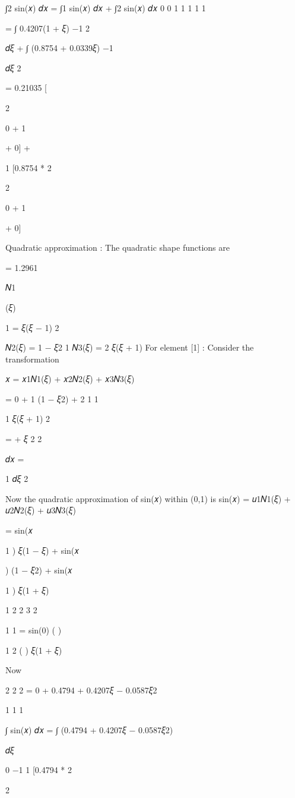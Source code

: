 {{{{{{∫2 sin(𝑥) 𝑑𝑥 = ∫1 sin(𝑥) 𝑑𝑥 + ∫2 sin(𝑥) 𝑑𝑥
0	0	1
1	1	1	1
 
= ∫  0.4207(1 + 𝜉)  
−1	2
 
𝑑𝜉 + ∫ (0.8754 + 0.0339𝜉)
−1
 
  𝑑𝜉 2
 

 
= 0.21035 [
 
2

 
0 + 1
 
+ 0] +
 
1
  [0.8754 *
2
 
2

 
0 + 1
 
+ 0]
 

 


Quadratic approximation :
The quadratic shape functions are
 
= 1.2961
 

 
𝑁1
 
(𝜉)
 
1
=   𝜉(𝜉 − 1)
2
 
𝑁2(𝜉) = 1 − 𝜉2
1
𝑁3(𝜉) = 2 𝜉(𝜉 + 1)
For element [1] : Consider the transformation
 
𝑥 = 𝑥1𝑁1(𝜉) + 𝑥2𝑁2(𝜉) + 𝑥3𝑁3(𝜉)

 
= 0 + 1 (1 − 𝜉2) +
2
1	1
 
1
  𝜉(𝜉 + 1)
2
 
=   +   𝜉
2	2
 
𝑑𝑥 =
 
1 𝑑𝜉
2
 
Now the quadratic approximation of sin(𝑥) within (0,1) is
sin(𝑥) = 𝑢1𝑁1(𝜉) + 𝑢2𝑁2(𝜉) + 𝑢3𝑁3(𝜉)

 
= sin(𝑥
 
1
)   𝜉(1 − 𝜉) + sin(𝑥
 
) (1 − 𝜉2) + sin(𝑥
 
1
)   𝜉(1 + 𝜉)
 
1  2	2	3  2

 
1	1
= sin(0)    (	)	 
 
1
2	( )   𝜉(1 + 𝜉)
 



Now
 
2	2	2
= 0 + 0.4794 + 0.4207𝜉 − 0.0587𝜉2


1	1	1
 
∫ sin(𝑥) 𝑑𝑥 = ∫ (0.4794 + 0.4207𝜉 − 0.0587𝜉2)
 
  𝑑𝜉
 
0	−1
1
  [0.4794 *
2
 

2

}}}}}}
